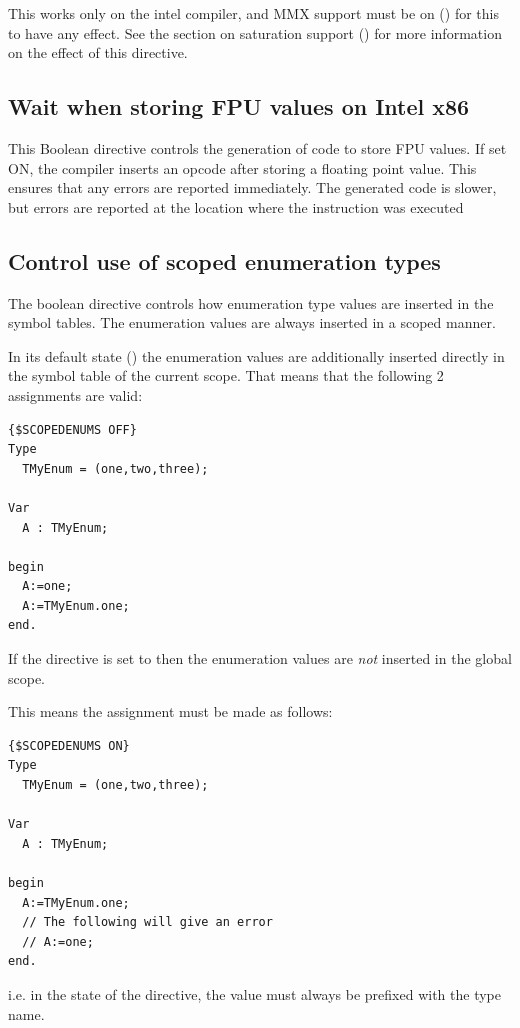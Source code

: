 This works only on the intel compiler, and MMX support must be on
() for this to have any effect. See the section on
saturation support () for more information
on the effect of this directive.

\subsection{ Wait when storing FPU values on Intel x86}

This Boolean directive controls the generation of code to store FPU values.  
If set ON, the compiler inserts an  opcode after storing
a floating point value.  This ensures that any errors are reported
immediately.  The generated code is slower, but errors are reported at
the location where the instruction was executed


\subsection{ Control use of scoped enumeration types}
The boolean  directive controls how enumeration type values 
are inserted in the symbol tables. The enumeration values are always
inserted in a scoped manner. 

In its default state () the enumeration values are additionally inserted 
directly in the symbol table of the current scope. That means that the
following 2 assignments are valid: 

\begin{verbatim}
{$SCOPEDENUMS OFF}
Type
  TMyEnum = (one,two,three);

Var
  A : TMyEnum;

begin
  A:=one;
  A:=TMyEnum.one;
end.
\end{verbatim}

If the directive is set to  then the enumeration values are {\em
not} inserted in the global scope.

This means the assignment must be made as follows:
\begin{verbatim}
{$SCOPEDENUMS ON}
Type
  TMyEnum = (one,two,three);

Var
  A : TMyEnum;

begin
  A:=TMyEnum.one;
  // The following will give an error
  // A:=one;
end.
\end{verbatim}
i.e. in the  state of the directive, the value must always be prefixed with the type name.

